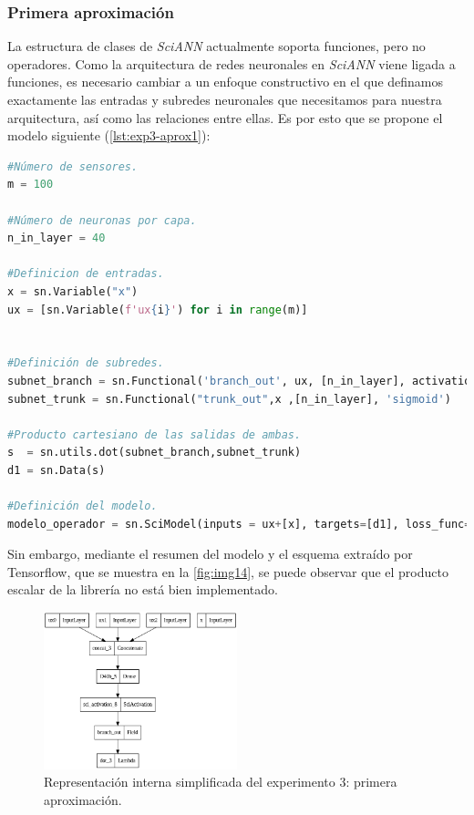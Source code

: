 \subsubsection{Primera aproximación}

La estructura de clases de \textit{SciANN} actualmente soporta funciones, pero no operadores. Como la arquitectura de redes neuronales en \textit{SciANN} viene ligada a funciones, es necesario cambiar a un enfoque constructivo en el que definamos exactamente las entradas y subredes neuronales que necesitamos para nuestra arquitectura, así como las relaciones entre ellas. Es por esto que se propone el modelo siguiente (\autoref{lst:exp3-aprox1}): 


\begin{lstlisting}[language=Python,caption={Primera aproximación para el modelo de aprendizaje de operadores.},label={lst:exp3-aprox1}]
#Número de sensores.
m = 100

#Número de neuronas por capa.
n_in_layer = 40

#Definicion de entradas.
x = sn.Variable("x")
ux = [sn.Variable(f'ux{i}') for i in range(m)]


#Definición de subredes.
subnet_branch = sn.Functional('branch_out', ux, [n_in_layer], activation='sigmoid')
subnet_trunk = sn.Functional("trunk_out",x ,[n_in_layer], 'sigmoid')

#Producto cartesiano de las salidas de ambas.
s  = sn.utils.dot(subnet_branch,subnet_trunk)
d1 = sn.Data(s)

#Definición del modelo.
modelo_operador = sn.SciModel(inputs = ux+[x], targets=[d1], loss_func='MSE',optimizer="adam")
\end{lstlisting}

Sin embargo, mediante el resumen del modelo y el esquema extraído por Tensorflow, que se muestra en la \autoref{fig:img14}, se puede observar que el producto escalar de la librería no está bien implementado.

 \begin{figure}[htbp]
    \centering
    \includegraphics[width=0.5\textwidth]{img/img14.png}
    \caption{Representación interna simplificada del experimento 3: primera aproximación.}
    \label{fig:img14}
\end{figure}

